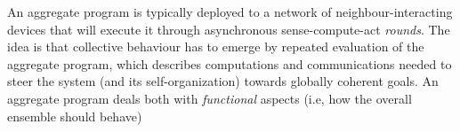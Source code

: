 An aggregate program is typically deployed
 to a network of neighbour-interacting devices
 that will execute it 
 through asynchronous sense-compute-act \emph{rounds}.
%
%
The idea is that collective behaviour 
 has to emerge by repeated evaluation of the aggregate program,
 which describes computations and communications
 needed to steer the system (and its self-organization)
 towards globally coherent goals.
%
An aggregate program deals both with \emph{functional} aspects (i.e, how the overall ensemble should behave) 

